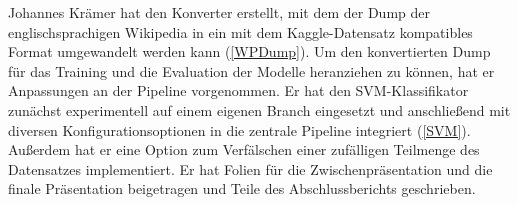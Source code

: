 Johannes Krämer hat den Konverter erstellt, mit dem der Dump der englischsprachigen Wikipedia in ein mit dem Kaggle-Datensatz kompatibles Format umgewandelt werden kann (\ref{WPDump}). Um den konvertierten Dump für das Training und die Evaluation der Modelle heranziehen zu können, hat er Anpassungen an der Pipeline vorgenommen. Er hat den SVM-Klassifikator zunächst experimentell auf einem eigenen Branch eingesetzt und anschließend mit diversen Konfigurationsoptionen in die zentrale Pipeline integriert (\ref{SVM}). Außerdem hat er eine Option zum Verfälschen einer zufälligen Teilmenge des Datensatzes implementiert. Er hat Folien für die Zwischenpräsentation und die finale Präsentation beigetragen und Teile des Abschlussberichts geschrieben.